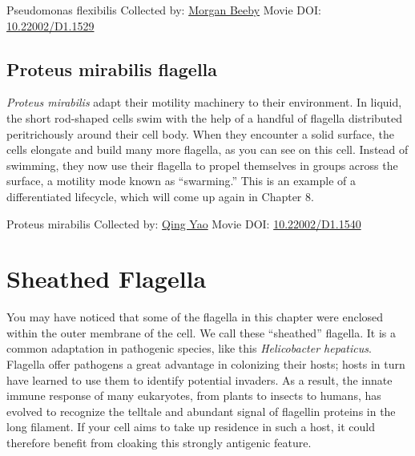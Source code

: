 \documentclass[]{tufte-book}
\begin{document}
\hypertarget{htmlwidget-6ee00f2282ee8119eab7}{}

\label{fig:6-5}Pseudomonas flexibilis Collected by: \protect\hyperlink{morgan_beeby}{Morgan Beeby} Movie DOI: \href{https://doi.org/10.22002/D1.1529}{10.22002/D1.1529}

\hypertarget{Proteus_mirabilis_flagella}{%
\subsection{Proteus mirabilis flagella}\label{Proteus_mirabilis_flagella}}

\emph{Proteus mirabilis} adapt their motility machinery to their environment. In liquid, the short rod-shaped cells swim with the help of a handful of flagella distributed peritrichously around their cell body. When they encounter a solid surface, the cells elongate and build many more flagella, as you can see on this cell. Instead of swimming, they now use their flagella to propel themselves in groups across the surface, a motility mode known as ``swarming.'' This is an example of a differentiated lifecycle, which will come up again in Chapter 8.



\hypertarget{htmlwidget-775d7dd2cc56495f5e55}{}

\label{fig:6-5a}Proteus mirabilis Collected by: \protect\hyperlink{qing_yao}{Qing Yao} Movie DOI: \href{https://doi.org/10.22002/D1.1540}{10.22002/D1.1540}

\hypertarget{sheathed-flagella}{%
\section{Sheathed Flagella}\label{sheathed-flagella}}

You may have noticed that some of the flagella in this chapter were enclosed within the outer membrane of the cell. We call these ``sheathed'' flagella. It is a common adaptation in pathogenic species, like this \emph{Helicobacter hepaticus}. Flagella offer pathogens a great advantage in colonizing their hosts; hosts in turn have learned to use them to identify potential invaders. As a result, the innate immune response of many eukaryotes, from plants to insects to humans, has evolved to recognize the telltale and abundant signal of flagellin proteins in the long filament. If your cell aims to take up residence in such a host, it could therefore benefit from cloaking this strongly antigenic feature.
\end{document}
